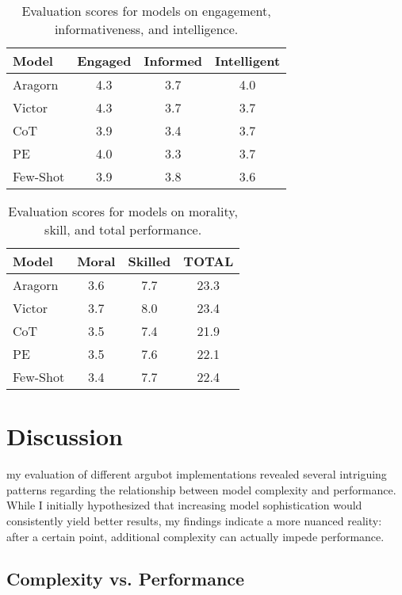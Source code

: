 \documentclass[11pt]{article}
\begin{document}
\small
\begin{table}[t]
\centering
\begin{tabular}{lccc}
    \hline
    {Model} & {Engaged} & {Informed} & {Intelligent} \\
    \hline
    Aragorn & 4.3 & 3.7 & 4.0 \\
    Victor & 4.3 & 3.7 & 3.7 \\
    CoT & 3.9 & 3.4 & 3.7 \\
    PE & 4.0 & 3.3 & 3.7 \\
    Few-Shot & 3.9 & 3.8 & 3.6 \\
    \hline
\end{tabular}
\caption{Evaluation scores for models on engagement, informativeness, and intelligence.}
\label{tab:evaluation_part1}
\end{table}

\small
\begin{table}[t]
\centering
\begin{tabular}{lccc}
    \hline
    {Model} & {Moral} & {Skilled} & \textbf{TOTAL} \\
    \hline
    Aragorn & 3.6 & 7.7 & 23.3 \\
    Victor & 3.7 & 8.0 & 23.4 \\
    CoT & 3.5 & 7.4 & 21.9 \\
    PE & 3.5 & 7.6 & 22.1 \\
    Few-Shot & 3.4 & 7.7 & 22.4 \\
    \hline
\end{tabular}
\caption{Evaluation scores for models on morality, skill, and total performance.}
\label{tab:evaluation_part2}
\end{table}


\section{Discussion}

 my evaluation of different argubot implementations revealed several intriguing patterns regarding the relationship between model complexity and performance. While  I initially hypothesized that increasing model sophistication would consistently yield better results,  my findings indicate a more nuanced reality: after a certain point, additional complexity can actually impede performance.

\subsection{Complexity vs. Performance}
\end{document}
